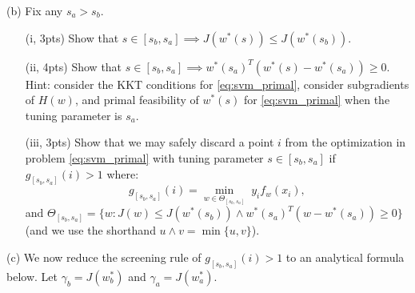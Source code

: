 \documentclass{article}
\theoremstyle{remark}
\theoremstyle{definition}
\begin{document}
\bigskip
\noindent
(b) Fix any $s_a > s_b$.  

\begin{enumerate}[(i)]
\item[(i, 3pts)] Show that $s \in [s_b,s_a] \implies J(w^*(s)) \leq J(w^*(s_b))$.  

\item[(ii, 4pts)] Show that $s\in[s_b,s_a] \implies
  w^*(s_a)^T(w^*(s)-w^*(s_a))\geq 0$.  Hint: consider the KKT
  conditions for \eqref{eq:svm_primal}, consider subgradients of $H(w)$, and 
  primal feasibility of $w^*(s)$ for \eqref{eq:svm_primal} when the tuning
  parameter is $s_a$.  


\item[(iii, 3pts)] Show that we may safely discard a point $i$ from the optimization in
  problem \eqref{eq:svm_primal} with tuning parameter $s \in [s_b,s_a]$ if
  $g_{[s_b,s_a]}(i)>1$ where:  
\begin{equation}\label{eq:screen}
g_{[s_b,s_a]}(i) = \min_{w\in \Theta_{[s_b,s_a]}} \; y_i f_w(x_i) ,
\end{equation}
and $\Theta_{[s_b,s_a]} = \{ w : J(w) \leq J(w^*(s_b)) \wedge
w^*(s_a)^T(w-w^*(s_a))\geq 0 \}$ (and we use the shorthand $u \wedge v =
\min\{u,v\}$). 

\end{enumerate}

\bigskip
\noindent
(c) We now reduce the screening rule of $g_{[s_b,s_a]}(i)>1$ to an analytical
formula below. Let $\gamma_b = J(w^*_b)$ and $\gamma_a = J(w^*_a)$.  
\end{document}

